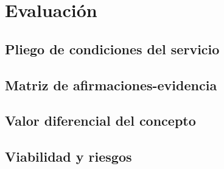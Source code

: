 \section{Evaluación}\label{sec:evaluacion}

\subsection{Pliego de condiciones del servicio}\label{sec:pliego}
\begin{pendiente}
\end{pendiente}

\subsection{Matriz de afirmaciones-evidencia}\label{sec:evidence-matrix}
\begin{pendiente}
\end{pendiente}

\subsection{Valor diferencial del concepto}\label{sec:valor-diferencial}
\begin{pendiente}
\end{pendiente}

\subsection{Viabilidad y riesgos}\label{sec:viabilidad-riesgos}
\begin{pendiente}
\end{pendiente}

